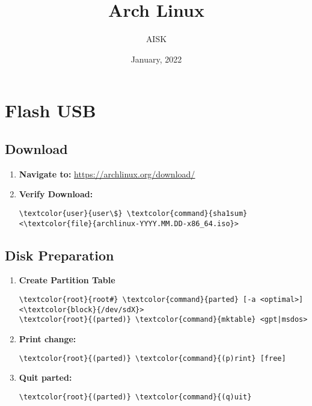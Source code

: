 \documentclass[10pt, a4paper, onecolumn, openany]{book} %
\title{\textbf{Arch Linux}}
\author{AISK}
\date{January, 2022}
\begin{document}
\maketitle
\tableofcontents

\chapter{Flash USB}
\section{Download}
\begin{enumerate}
    \item \textbf{Navigate to:}
\newline \underline{\href{https://archlinux.org/download/}{https://archlinux.org/download/}}
    \item \textbf{Verify Download:}
\begin{Verbatim}[commandchars=\\\{\}]
\textcolor{user}{user\$} \textcolor{command}{sha1sum} <\textcolor{file}{archlinux-YYYY.MM.DD-x86_64.iso}>
\end{Verbatim}
\end{enumerate}
\section{Disk Preparation}
\begin{enumerate}
    \item \textbf{Create Partition Table}
\begin{Verbatim}[commandchars=\\\{\}]
\textcolor{root}{root#} \textcolor{command}{parted} [-a <optimal>] <\textcolor{block}{/dev/sdX}>
\textcolor{root}{(parted)} \textcolor{command}{mktable} <gpt|msdos>
\end{Verbatim}
    \item \textbf{Print change:}
\begin{Verbatim}[commandchars=\\\{\}]
\textcolor{root}{(parted)} \textcolor{command}{(p)rint} [free]
\end{Verbatim}
    \item \textbf{Quit parted:}
\begin{Verbatim}[commandchars=\\\{\}]
\textcolor{root}{(parted)} \textcolor{command}{(q)uit}
\end{Verbatim}
\end{enumerate}
\end{document}
